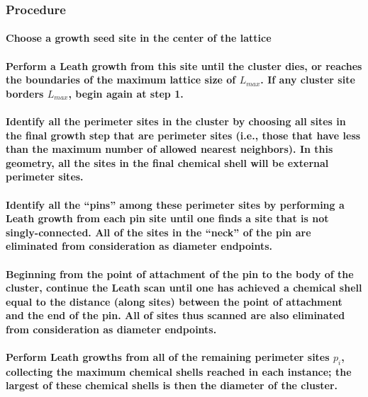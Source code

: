 \documentclass[pre,preprint]{revtex4-1}
\begin{document}
\subsubsection{Procedure}
\label{sec-2.4.6}
\paragraph{Choose a growth seed site in the center of the lattice}
\label{sec-2.4.6.1}
\paragraph{Perform a Leath growth from this site until the cluster dies, or reaches the boundaries of the maximum lattice size of $L_{max}$. If any cluster site borders $L_{max}$, begin again at step 1.}
\label{sec-2.4.6.2}
\paragraph{Identify all the perimeter sites in the cluster by choosing all sites in the final growth step that are perimeter sites (i.e., those that have less than the maximum number of allowed nearest neighbors).  In this geometry, all the sites in the final chemical shell will be external perimeter sites.}
\label{sec-2.4.6.3}
\paragraph{Identify all the ``pins'' among these perimeter sites by performing a Leath growth from each pin site until one finds a site that is not singly-connected.  All of the sites in the ``neck'' of the pin are eliminated from consideration as diameter endpoints.}
\label{sec-2.4.6.4}
\paragraph{Beginning from the point of attachment of the pin to the body of the cluster, continue the Leath scan until one has achieved a chemical shell equal to the distance (along sites) between the point of attachment and the end of the pin.  All of sites thus scanned are also eliminated from consideration as diameter endpoints.}
\label{sec-2.4.6.5}
\paragraph{Perform Leath growths from all of the remaining perimeter sites $p_i$, collecting the maximum chemical shells reached in each instance; the largest of these chemical shells is then the diameter of the cluster.}
\label{sec-2.4.6.6}
\end{document}
